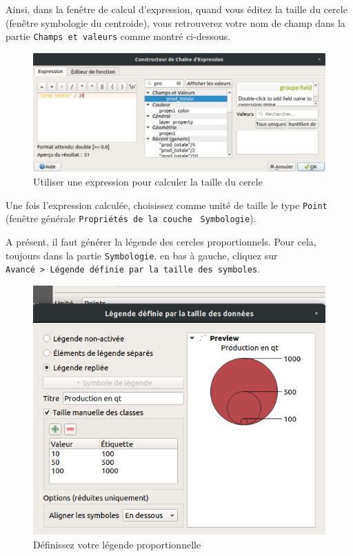 Ainsi, dans la fenêtre de calcul d'expression, quand vous éditez la
taille du cercle (fenêtre symbologie du centroide), vous retrouverez
votre nom de champ dans la partie \texttt{Champs\ et\ valeurs} comme
montré ci-dessous.

\begin{figure}[htbp]
\centering
\includegraphics{figures/division_taille_champ.png}
\caption{Utiliser une expression pour calculer la taille du cercle}
\end{figure}

Une fois l'expression calculée, choisissez comme unité de taille le type
\texttt{Point} (fenêtre générale \texttt{Propriétés\ de\ la\ couche}
~\texttt{Symbologie}).

A présent, il faut générer la légende des cercles proportionnels. Pour
cela, toujours dans la partie \texttt{Symbologie}, en bas à gauche,
cliquez sur
\texttt{Avancé\ \textgreater{}\ Légende\ définie\ par\ la\ taille\ des\ symboles}.

\begin{figure}[htbp]
\centering
\includegraphics{figures/legend_propor.png}
\caption{Définissez votre légende proportionnelle}
\end{figure}

